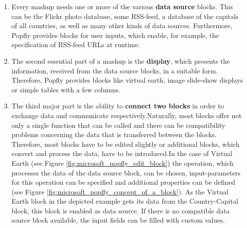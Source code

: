 \begin{enumerate}
\item Every mashup needs one or more of the various \textbf{data source}
blocks. This can be the Flickr photo database, some RSS-feed, a database of the
capitals of all countries, as well as many other kinds of data sources.\newline
Furthermore, Popfly provides blocks for user inputs, which enable, for example,
the specification of RSS-feed URLs at runtime.

\item The second essential part of a mashup is the \textbf{display}, which
presents the information, received from the data source blocks, in a suitable
form. Therefore, Popfly provides blocks like virtual earth, image slide-show
displays or simple tables with a few columns.

\item The third major part is the ability to \textbf{connect two blocks} in order
to exchange data and communicate respectively.\newline Naturally, most blocks
offer not only a single function that can be called and there can be
compatibility problems concerning the data that is transferred between the
blocks. Therefore, most blocks have to be edited slightly or additional blocks,
which convert and process the data, have to be introduced.\newline In the case of
Virtual Earth (see Figure \ref{fig:microsoft_popfly_edit_block}) the operation,
which processes the data of the data source block, can be chosen,
input-parameters for this operation can be specified and additional properties
can be defined (see Figure
\ref{fig:microsoft_popfly_concept_of_a_block}). As the Virtual Earth
block in the depicted example gets its data from the Country-Capital block, this
block is enabled as data source. If there is no compatible data source block
available, the input fields can be filled with custom values.
\end{enumerate}

